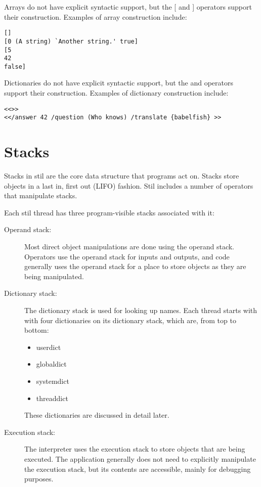Arrays do not have explicit syntactic support, but the [ and ] operators support
their construction.  Examples of array construction include:
\begin{verbatim}
[]
[0 (A string) `Another string.' true]
[5
42
false]
\end{verbatim}

Dictionaries do not have explicit syntactic support, but the {\lt}{\lt} and
{\gt}{\gt} operators support their construction.  Examples of dictionary
construction include:
\begin{verbatim}
<<>>
<</answer 42 /question (Who knows) /translate {babelfish} >>
\end{verbatim}

\section{Stacks}

Stacks in stil are the core data structure that programs act on.  Stacks store
objects in a last in, first out (LIFO) fashion.  Stil includes a number of
operators that manipulate stacks.

Each stil thread has three program-visible stacks associated with it:
\begin{description}
\item[Operand stack: ] Most direct object manipulations are done using the
	operand stack.  Operators use the operand stack for inputs and outputs,
	and code generally uses the operand stack for a place to store objects
	as they are being manipulated.
\item[Dictionary stack: ] The dictionary stack is used for looking up names.
	Each thread starts with with four dictionaries on its dictionary stack,
	which are, from top to bottom:
	\begin{itemize}
	\item{userdict}
	\item{globaldict}
	\item{systemdict}
	\item{threaddict}
	\end{itemize}
	These dictionaries are discussed in detail later.
\item[Execution stack: ] The interpreter uses the execution stack to store
	objects that are being executed.  The application generally does not
	need to explicitly manipulate the execution stack, but its contents are
	accessible, mainly for debugging purposes.
\end{description}

